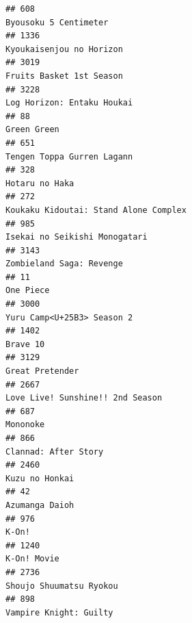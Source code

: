 \documentclass[
]{article}
\begin{document}
\begin{verbatim}
## 608                                                                                      Byousoku 5 Centimeter
## 1336                                                                                  Kyoukaisenjou no Horizon
## 3019                                                                                  Fruits Basket 1st Season
## 3228                                                                                Log Horizon: Entaku Houkai
## 88                                                                                                 Green Green
## 651                                                                                 Tengen Toppa Gurren Lagann
## 328                                                                                             Hotaru no Haka
## 272                                                                      Koukaku Kidoutai: Stand Alone Complex
## 985                                                                              Isekai no Seikishi Monogatari
## 3143                                                                                  Zombieland Saga: Revenge
## 11                                                                                                   One Piece
## 3000                                                                                Yuru Camp<U+25B3> Season 2
## 1402                                                                                                  Brave 10
## 3129                                                                                           Great Pretender
## 2667                                                                          Love Live! Sunshine!! 2nd Season
## 687                                                                                                   Mononoke
## 866                                                                                       Clannad: After Story
## 2460                                                                                            Kuzu no Honkai
## 42                                                                                              Azumanga Daioh
## 976                                                                                                      K-On!
## 1240                                                                                               K-On! Movie
## 2736                                                                                   Shoujo Shuumatsu Ryokou
## 898                                                                                     Vampire Knight: Guilty

\end{verbatim}
\end{document}

